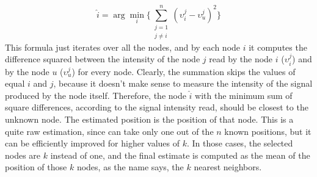 \documentclass[12pt]{report}
\begin{document}
\begin{equation}
    \hat{i}=\arg \min_i\bigg\{\sum_{\substack{j=1\\j\neq i}}^n(\upsilon_i^j-\upsilon_{u}^j)^2\bigg\}
\end{equation}
This formula just iterates over all the nodes, and by each node $i$ it computes the difference squared between the intensity of the node $j$ read by the node $i$ ($\upsilon_i^j$) and by the node $u$ ($\upsilon_u^j$) for every node. Clearly, the summation skips the values of equal $i$ and $j$, because it doesn't make sense to measure the intensity of the signal produced by the node itself. Therefore, the node $\hat{i}$ with the minimum sum of square differences, according to the signal intensity read, should be closest to the unknown node. The estimated position is the position of that node. This is a quite raw estimation, since can take only one out of the $n$ known positions, but it can be efficiently improved for higher values of $k$. In those cases, the selected nodes are $k$ instead of one, and the final estimate is computed as the mean of the position of those $k$ nodes, as the name says, the $k$ nearest neighbors.
\end{document}
